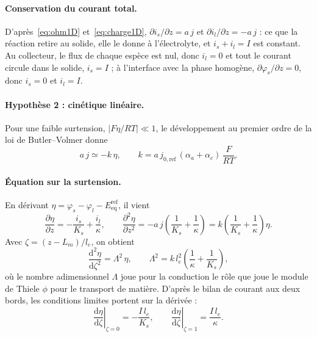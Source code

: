 \paragraph{Conservation du courant total.} D'après~\eqref{eq:ohm1D}
et~\eqref{eq:charge1D}, $\partial i_s/\partial z = a\,j$ et
$\partial i_l/\partial z = -a\,j$ : ce que la réaction retire au solide, elle
le donne à l'électrolyte, et $i_s + i_l = I$ est constant. Au collecteur, le
flux de chaque espèce est nul, donc $i_l = 0$ et tout le courant circule dans
le solide, $i_s = I$ ; à l'interface avec la phase homogène,
$\partial\varphi_s/\partial z = 0$, donc $i_s = 0$ et $i_l = I$.

\paragraph{Hypothèse 2 : cinétique linéaire.} Pour une faible surtension,
$|F\eta/RT| \ll 1$, le développement au premier ordre de la loi de
Butler--Volmer donne
\begin{equation}
a\,j \simeq -k\,\eta,
\qquad
k = a\,j_{0,\mathrm{ref}}\,(\alpha_a + \alpha_c)\,\frac{F}{RT} .
\end{equation}

\paragraph{Équation sur la surtension.} En dérivant
$\eta = \varphi_s - \varphi_l - E_{\mathrm{eq}}^{\mathrm{ref}}$, il vient
\begin{equation}
\frac{\partial\eta}{\partial z} = -\frac{i_s}{K_s} + \frac{i_l}{\kappa},
\qquad
\frac{\partial^2\eta}{\partial z^2}
= -a\,j\left(\frac{1}{K_s} + \frac{1}{\kappa}\right)
= k\left(\frac{1}{K_s} + \frac{1}{\kappa}\right)\eta .
\label{eq:NT_derivee}
\end{equation}
Avec $\zeta = (z - L_m)/l_e$, on obtient
\begin{equation}
\frac{\mathrm{d}^2\eta}{\mathrm{d}\zeta^2} = \Lambda^2\,\eta,
\qquad
\Lambda^2 = k\,l_e^2\left(\frac{1}{\kappa} + \frac{1}{K_s}\right),
\end{equation}
où le nombre adimensionnel $\Lambda$ joue pour la conduction le rôle que joue
le module de Thiele $\phi$ pour le transport de matière. D'après le bilan de
courant aux deux bords, les conditions limites portent sur la dérivée :
\begin{equation}
\left.\frac{\mathrm{d}\eta}{\mathrm{d}\zeta}\right|_{\zeta=0} = -\frac{I\,l_e}{K_s},
\qquad
\left.\frac{\mathrm{d}\eta}{\mathrm{d}\zeta}\right|_{\zeta=1} = \frac{I\,l_e}{\kappa} .
\end{equation}

